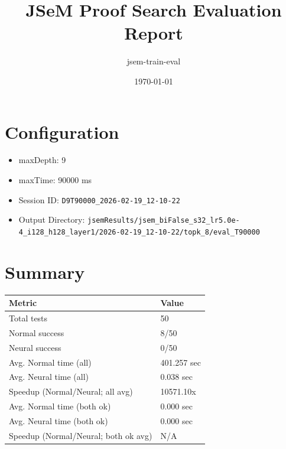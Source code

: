\documentclass[a4paper,10pt]{article}
\title{JSeM Proof Search Evaluation Report}
\author{jsem-train-eval}
\date{\today}
\begin{document}
\maketitle

\section{Configuration}
\begin{itemize}
\item maxDepth: 9
\item maxTime: 90000 ms
\item Session ID: \texttt{D9T90000\_2026-02-19\_12-10-22}
\item Output Directory: \texttt{jsemResults/jsem\_biFalse\_s32\_lr5.0e-4\_i128\_h128\_layer1/2026-02-19\_12-10-22/topk\_8/eval\_T90000}
\end{itemize}

\section{Summary}
\begin{tabular}{ll}
\toprule
\textbf{Metric} & \textbf{Value} \\
\midrule
Total tests & 50 \\
Normal success & 8/50 \\
Neural success & 0/50 \\
\midrule
Avg. Normal time (all) & 401.257 sec \\
Avg. Neural time (all) & 0.038 sec \\
Speedup (Normal/Neural; all avg) & 10571.10x \\
Avg. Normal time (both ok) & 0.000 sec \\
Avg. Neural time (both ok) & 0.000 sec \\
Speedup (Normal/Neural; both ok avg) & N/A \\
\bottomrule
\end{tabular}
\end{document}
